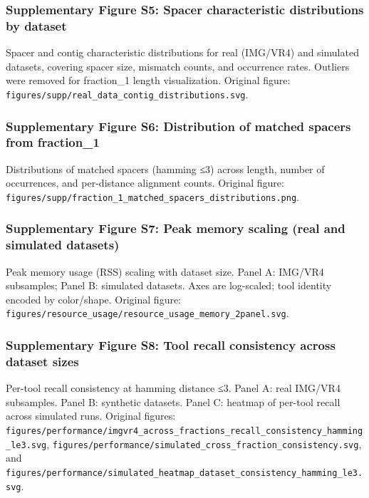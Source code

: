 \documentclass[
]{article}
\begin{document}
\subsubsection{Supplementary Figure S5: Spacer characteristic
distributions by dataset}\label{fig-supp-spacer-distributions}

Spacer and contig characteristic distributions for real (IMG/VR4) and
simulated datasets, covering spacer size, mismatch counts, and
occurrence rates. Outliers were removed for fraction\_1 length
visualization. Original figure:
\texttt{figures/supp/real\_data\_contig\_distributions.svg}.

\subsubsection{Supplementary Figure S6: Distribution of matched spacers
from fraction\_1}\label{fig-supp-occurrence-distribution}

Distributions of matched spacers (hamming ≤3) across length, number of
occurrences, and per-distance alignment counts. Original figure:
\texttt{figures/supp/fraction\_1\_matched\_spacers\_distributions.png}.

\subsubsection{Supplementary Figure S7: Peak memory scaling (real and
simulated datasets)}\label{fig-supp-resource-memory}

Peak memory usage (RSS) scaling with dataset size. Panel A: IMG/VR4
subsamples; Panel B: simulated datasets. Axes are log-scaled; tool
identity encoded by color/shape. Original figure:
\texttt{figures/resource\_usage/resource\_usage\_memory\_2panel.svg}.

\subsubsection{Supplementary Figure S8: Tool recall consistency across
dataset sizes}\label{fig-supp-sim-consistency}

Per-tool recall consistency at hamming distance ≤3. Panel A: real
IMG/VR4 subsamples. Panel B: synthetic datasets. Panel C: heatmap of
per-tool recall across simulated runs. Original figures:
\texttt{figures/performance/imgvr4\_across\_fractions\_recall\_consistency\_hamming\_le3.svg},
\texttt{figures/performance/simulated\_cross\_fraction\_consistency.svg},
and
\texttt{figures/performance/simulated\_heatmap\_dataset\_consistency\_hamming\_le3.svg}.
\end{document}
